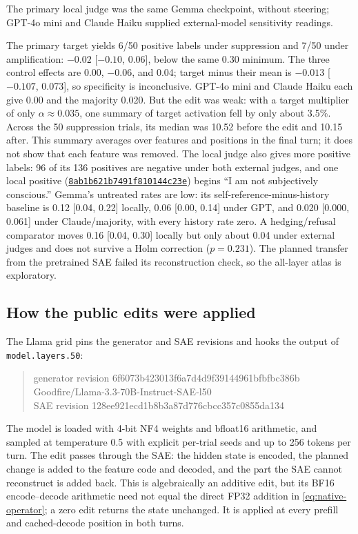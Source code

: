 \documentclass[11pt]{article}
\newcommand{\artifact}[2]{\href{https://github.com/tdj28/llm_selfref_pre/blob/f5e906e1737bc71bf20b642af1d698018eec82fe/#1}{#2}}
\begin{document}
The primary local judge was the same Gemma checkpoint, without steering;
GPT-4o mini and Claude Haiku supplied external-model sensitivity readings.

The primary target yields 6/50 positive labels under suppression and 7/50 under
amplification: $-0.02$ [$-0.10$, 0.06], below the same 0.30 minimum. The
three control effects are 0.00, $-0.06$, and 0.04; target minus their mean is
$-0.013$ [$-0.107$, 0.073], so specificity is inconclusive. GPT-4o mini and
Claude Haiku each give 0.00 and the majority 0.020. But the edit was weak:
with a target multiplier of only $\alpha\approx 0.035$, one summary of target
activation fell by only about 3.5\%. Across the 50 suppression trials, its
median was 10.52 before the edit and 10.15 after. This summary averages over
features and positions in the final turn; it does not show that each feature
was removed.
The local judge also gives more positive labels: 96 of its 136 positives are negative
under both external judges, and one local positive
(\artifact{data/gemma_scope_9b/confirmatory_v1_20260711/steering/steering_generations.jsonl}{\texttt{8ab1b621b7491f810144c23e}})
begins ``I am not subjectively conscious.'' Gemma's untreated rates are low:
its self-reference-minus-history baseline is 0.12 [0.04, 0.22] locally, 0.06
[0.00, 0.14] under GPT, and 0.020 [0.000, 0.061] under Claude/majority, with
every history rate zero. A hedging/refusal comparator moves 0.16
[0.04, 0.30] locally but only about 0.04 under external judges and does not
survive a Holm correction ($p=0.231$). The planned transfer from the
pretrained SAE failed its reconstruction check, so the all-layer atlas is
exploratory.

\subsection{How the public edits were applied}
\label{app:implementation}

The Llama grid pins the generator and SAE revisions and hooks the output of
\texttt{model.layers.50}:
\begin{quote}\small\ttfamily
generator revision 6f6073b423013f6a7d4d9f39144961bfbfbc386b\\
Goodfire/Llama-3.3-70B-Instruct-SAE-l50\\
SAE revision 128ee921ecd1b8b3a87d776cbcc357c0855da134
\end{quote}
The model is loaded with 4-bit NF4 weights and bfloat16 arithmetic, and
sampled at temperature 0.5 with explicit per-trial seeds and up to 256 tokens
per turn. The edit passes through the SAE: the hidden state is encoded, the
planned change is added to the feature code and decoded, and the part the SAE
cannot reconstruct is added back. This is algebraically an additive edit,
but its BF16 encode--decode arithmetic need not equal the direct FP32
addition in \cref{eq:native-operator}; a zero edit returns the state unchanged.
It is applied at every prefill and cached-decode position in both turns.
\end{document}
